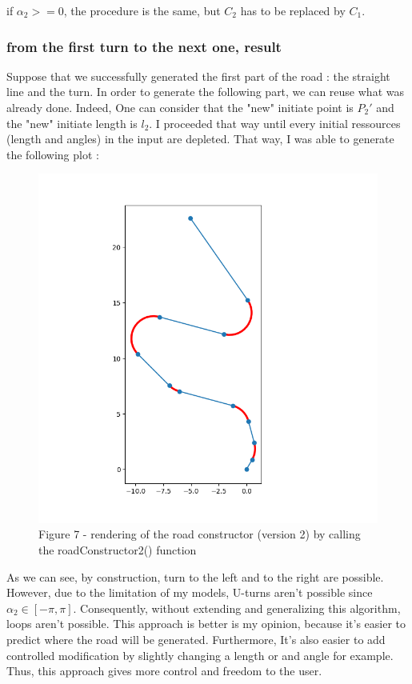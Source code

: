 \documentclass[a4paper,12pt,fleqn]{article}
\begin{document}
if \mbox{$\alpha_2 >= 0$}, the procedure is the same, but \mbox{$C_2$} has to be replaced by \mbox{$C_1$}.




\subsubsection{from the first turn to the next one, result}

Suppose that we successfully generated the first part of the road : the straight line and the turn. In order to generate the following part, we can reuse what was already done. Indeed, One can consider that the "new" initiate point is \mbox{$P_2{'}$} and the "new" initiate length is \mbox{$l_2$}. I proceeded that way until every initial ressources (length and angles) in the input are depleted. That way, I was able to generate the following plot :


\begin{figure}[H]
\centering
\includegraphics[width=\textwidth]{roadConstructor2}
Figure 7 - rendering of the road constructor (version 2) by calling the roadConstructor2() function
\end{figure}


As we can see,  by construction, turn to the left and to the right are possible. However, due to the limitation of my models, U-turns aren't possible since \mbox{$\alpha_2 \in [-\pi, \pi]$}. Consequently, without extending and generalizing this algorithm, loops aren't possible. This approach is better is my opinion, because it's easier to predict where the road will be generated. Furthermore, It's also easier to add controlled modification by slightly changing a length or and angle for example. Thus, this approach gives more control and freedom to the user.
\end{document}
